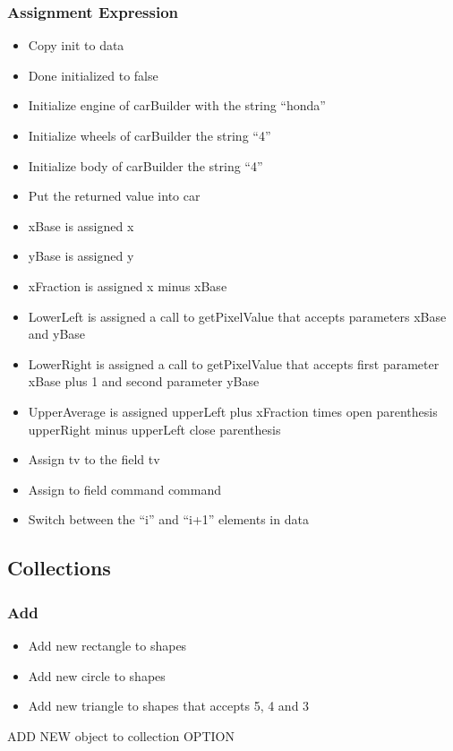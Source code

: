 \subsubsection{Assignment Expression}
\begin{itemize}
	\item Copy init to data
	\item Done initialized to false
	\item Initialize engine of carBuilder with the string “honda”
	\item Initialize wheels of carBuilder the string “4”
	\item Initialize body of carBuilder the string “4”
	\item Put the returned value into car
	\item xBase is assigned x
	\item yBase is assigned y
	\item xFraction is assigned x minus xBase
	\item LowerLeft is assigned a call to getPixelValue that accepts parameters xBase and yBase
	\item LowerRight is assigned a call to getPixelValue that accepts first parameter xBase plus 1 and second parameter yBase
	\item UpperAverage is assigned upperLeft plus xFraction times open parenthesis upperRight minus upperLeft close parenthesis
	\item Assign tv to the field tv
	\item Assign to field command command
	\item Switch between the “i” and “i+1” elements in data
\end{itemize}
\subsection{Collections}
\subsubsection{Add}
\begin{itemize}
	\item Add new rectangle to shapes
	\item Add new circle to shapes
	\item Add new triangle to shapes that accepts 5, 4 and 3
\end{itemize}
ADD NEW object to collection OPTION
